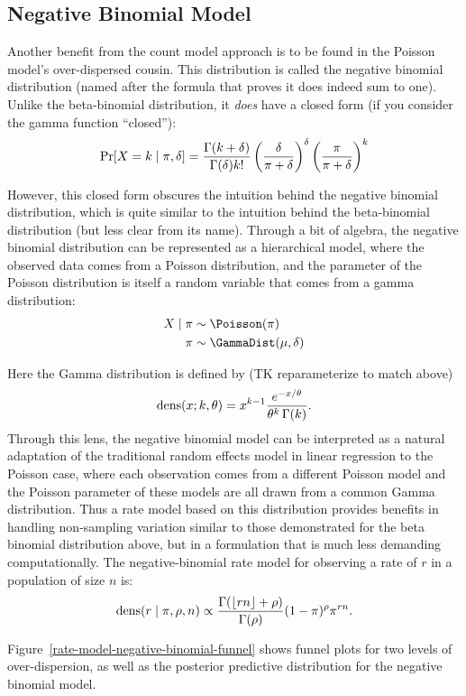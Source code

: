 \subsection{Negative Binomial Model}
Another benefit from the count model approach is to be found in the
Poisson model's over-dispersed cousin.  This distribution is called
the negative binomial distribution (named after the formula that
proves it does indeed sum to one).  Unlike the beta-binomial
distribution, it \emph{does} have a closed form (if you consider the
gamma function ``closed''):
\[
\operatorname{Pr}[X = k\;|\; \pi, \delta] =
 \frac{\Gamma(k+\delta)}{\Gamma(\delta)k!} \left(\frac{\delta}{\pi+\delta}\right)^\delta \left(\frac{\pi}{\pi+\delta}\right)^k
\]

However, this closed form obscures the intuition behind the negative
binomial distribution, which is quite similar to the intuition behind
the beta-binomial distribution (but less clear from its name). Through
a bit of algebra, the negative binomial distribution can be
represented as a hierarchical model, where the observed data comes
from a Poisson distribution, and the parameter of the Poisson
distribution is itself a random variable that comes from a gamma
distribution:
\begin{align*}
X\given \pi &\sim \Poisson(\pi)\\
\pi &\sim \GammaDist(\mu, \delta)
\end{align*}

Here the Gamma distribution is defined by (TK reparameterize to match above)
\[
\operatorname{dens}(x; k,\theta) = x^{k-1} \frac{e^{-x/\theta}}{\theta^k \, \Gamma(k)}.
\]
Through this lens, the negative binomial model can be interpreted as a
natural adaptation of the traditional random effects model in linear
regression to the Poisson case, where each observation comes from a
different Poisson model and the Poisson parameter of these models are
all drawn from a common Gamma distribution. Thus a rate model based on
this distribution provides benefits in handling non-sampling variation
similar to those demonstrated for the beta binomial distribution
above, but in a formulation that is much less demanding
computationally.  The negative-binomial rate model for observing a
rate of $r$ in a population of size $n$ is:
\[
\operatorname{dens}(r\;|\; \pi, \rho, n) \propto
 \frac{\Gamma(\lfloor rn\rfloor+\rho)}{\Gamma(\rho)} (1-\pi)^\rho \pi^{rn}.
\]

Figure~\ref{rate-model-negative-binomial-funnel} shows funnel plots
for two levels of over-dispersion, as well as the posterior predictive
distribution for the negative binomial model.

